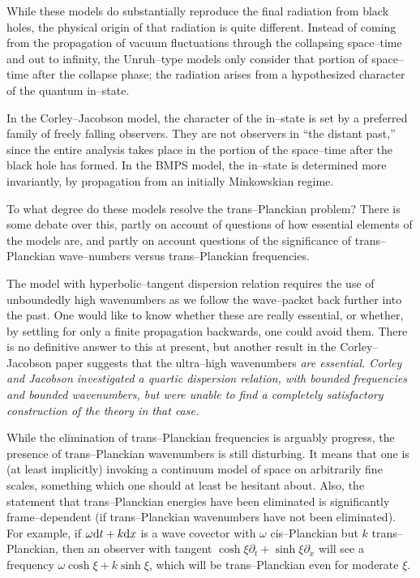 While these models do substantially reproduce the final radiation from black
holes, the physical origin of that radiation is quite different.  Instead of
coming from the propagation of vacuum fluctuations through the collapsing
space--time and out to infinity, the Unruh--type models only consider that
portion of space--time after the collapse phase; the radiation arises from a
hypothesized character of the quantum in--state.

In the Corley--Jacobson model, the character of the in--state is set by a
preferred family of freely falling observers.  They are not observers in ``the
distant past,''  since the entire analysis takes place in the portion of the
space--time after the black hole has formed.  In the BMPS model, the in--state
is determined more invariantly, by propagation from an initially Minkowskian
regime.

To what degree do these models resolve the trans--Planckian problem?
There is some debate over this, partly on account of questions of how 
essential elements of the models are,
and partly on account questions of the significance of
trans--Planckian wave--numbers versus trans--Planckian frequencies.

The model with hyperbolic--tangent dispersion relation requires the use of
unboundedly
high wavenumbers as we follow the wave--packet back further into the
past.  One would like to know whether these
are really essential, or whether, by settling for only a finite propagation
backwards, one could avoid them.  There is no definitive answer to this at
present, but another result in the Corley--Jacobson paper suggests
that the ultra--high wavenumbers
\it are \rm essential.  Corley and Jacobson investigated
a quartic dispersion
relation, with bounded frequencies and 
bounded wavenumbers, but were unable to find a
completely satisfactory construction of the theory in that case.

While the elimination of trans--Planckian frequencies is arguably progress, the
presence of trans--Planckian wavenumbers is still disturbing.  It
means that one is (at least implicitly) invoking a continuum model of space on
arbitrarily fine scales, something which one should at least be hesitant about. 
Also, the statement that trans--Planckian energies have been eliminated is
significantly frame--dependent (if trans--Planckian wavenumbers have not been
eliminated).  For example, if $\omega\d t +k\d x$ is a wave covector with
$\omega$ cis--Planckian but $k$ trans--Planckian, then an observer with tangent
$\cosh\xi \partial _t +\sinh\xi \partial _x$ will see a frequency 
$\omega\cosh\xi
+k\sinh\xi$, which will be trans--Planckian even for moderate $\xi$.

